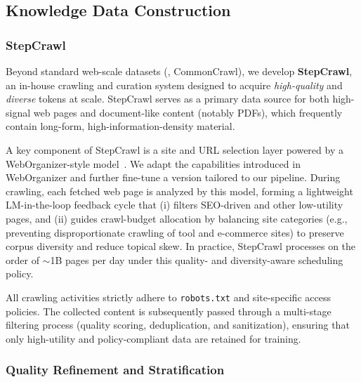 \subsection{Knowledge Data Construction}

\subsubsection{StepCrawl}
\label{subsubsec:stepcrawl}

Beyond standard web-scale datasets (\eg, CommonCrawl), we develop \textbf{StepCrawl}, an in-house crawling and curation system designed to acquire \emph{high-quality} and \emph{diverse} tokens at scale.
StepCrawl serves as a primary data source for both high-signal web pages and document-like content (notably PDFs), which frequently contain long-form, high-information-density material.

\noindent A key component of StepCrawl is a site and URL selection layer powered by a WebOrganizer-style model~\cite{weborganizer}.
We adapt the capabilities introduced in WebOrganizer and further fine-tune a version tailored to our pipeline.
During crawling, each fetched web page is analyzed by this model, forming a lightweight LM-in-the-loop feedback cycle that (i) filters SEO-driven and other low-utility pages, and (ii) guides crawl-budget allocation by balancing site categories (e.g., preventing disproportionate crawling of tool and e-commerce sites) to preserve corpus diversity and reduce topical skew.
In practice, StepCrawl processes on the order of $\sim$1B pages per day under this quality- and diversity-aware scheduling policy.

\noindent All crawling activities strictly adhere to \texttt{robots.txt} and site-specific access policies.
The collected content is subsequently passed through a multi-stage filtering process (quality scoring, deduplication, and sanitization), ensuring that only high-utility and policy-compliant data are retained for training.


\subsubsection{Quality Refinement and Stratification}


